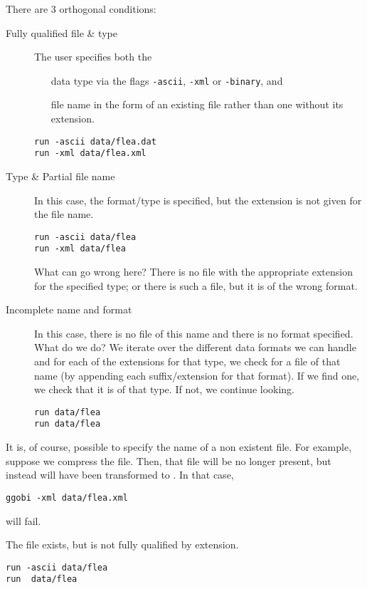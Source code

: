 \documentclass{article}
\begin{document}
There are 3 orthogonal conditions:
\begin{description}
\item[Fully qualified file \& type] 
The user specifies both the
\begin{itemize}
\item[data type]
via the flags \texttt{-ascii}, \texttt{-xml}
or \texttt{-binary}, and 
\item[file name]
in the form  of an existing file rather than
one without its extension.
\end{itemize}
\begin{verbatim}
run -ascii data/flea.dat
run -xml data/flea.xml
\end{verbatim}
\item[Type \& Partial file name]
In this case, the format/type is specified, 
but the extension is not given for the file name.
\begin{verbatim}
run -ascii data/flea
run -xml data/flea
\end{verbatim}
What can go wrong here? There is no file with the appropriate
extension for the specified type;
or there is such a file, but it is of the wrong format.
\item[Incomplete name and format] In this case, there is no file of
  this name and there is no format specified. What do we do?  We
  iterate over the different data formats we can handle and for each of the
  extensions for that type, we check for a file of that name (by appending
  each suffix/extension for that format). If we find one, we check
  that it is of that type. If not, we continue looking.
\begin{verbatim}
run data/flea
run data/flea
\end{verbatim}
\end{description}

It is, of course, possible to specify the name of a non existent file.
For example, suppose we compress the  file.  Then, that
file will be no longer present, but instead will have been transformed
to . In that case, 
\begin{verbatim}
ggobi -xml data/flea.xml
\end{verbatim}
will fail.




The file exists, but is not fully qualified by extension.
\begin{verbatim}
run -ascii data/flea
run  data/flea
\end{verbatim}
\end{document}

